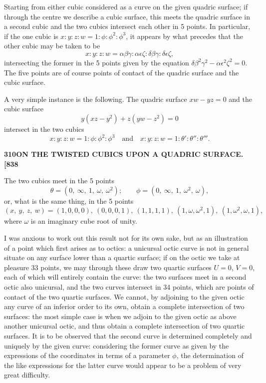 \documentclass[11pt]{article}
\begin{document}
\medskip

Starting from either cubic considered as a curve on the given quadric surface; if through the centre we describe a cubic surface, this meets the quadric surface in a second cubic and the two cubics intersect each other in 5 points. In particular, if the one cubic is $x : y : z : w = 1 : \phi : \phi^{2} : \phi^{3}$, it appears by what precedes that the other cubic may be taken to be
\[
x : y : z : w = \alpha\beta\gamma : \alpha\epsilon\zeta : \delta\beta\gamma : \delta\epsilon\zeta,
\]
intersecting the former in the 5 points given by the equation $\delta\beta^{2}\gamma^{2} - \alpha\epsilon^{2}\zeta^{2} = 0$. The five points are of course points of contact of the quadric surface and the cubic surface.

\medskip

A very simple instance is the following. The quadric surface $xw - yz = 0$ and the cubic surface
\[
y(xz - y^{2}) + z(yw - z^{2}) = 0
\]
intersect in the two cubics
\[
x : y : z : w = 1 : \phi : \phi^{2} : \phi^{3} \quad\text{and}\quad x : y : z : w = 1 : \theta' : \theta'' : \theta'''.
\]

\newpage

\noindent\textbf{310}\hfill\textbf{ON THE TWISTED CUBICS UPON A QUADRIC SURFACE.}\hfill\textbf{[838}

\bigskip

\noindent The two cubics meet in the 5 points
\[
\theta = (0,\ \infty,\ 1,\ \omega,\ \omega^{2}); \qquad \phi = (0,\ \infty,\ 1,\ \omega^{2},\ \omega),
\]
or, what is the same thing, in the 5 points
\[
(x,\ y,\ z,\ w) = (1, 0, 0, 0),\ (0, 0, 0, 1),\ (1, 1, 1, 1),\ (1, \omega, \omega^{2}, 1),\ (1, \omega^{2}, \omega, 1),
\]
where $\omega$ is an imaginary cube root of unity.

\medskip

I was anxious to work out this result not for its own sake, but as an illustration of a point which first arises as to octics: a unicursal octic curve is not in general situate on any surface lower than a quartic surface; if on the octic we take at pleasure 33 points, we may through these draw two quartic surfaces $U = 0$, $V = 0$, each of which will entirely contain the curve: the two surfaces meet in a second octic also unicursal, and the two curves intersect in 34 points, which are points of contact of the two quartic surfaces. We cannot, by adjoining to the given octic any curve of an inferior order to its own, obtain a complete intersection of two surfaces: the most simple case is when we adjoin to the given octic as above another unicursal octic, and thus obtain a complete intersection of two quartic surfaces. It is to be observed that the second curve is determined completely and uniquely by the given curve: considering the former curve as given by the expressions of the coordinates in terms of a parameter $\phi$, the determination of the like expressions for the latter curve would appear to be a problem of very great difficulty.
\end{document}
